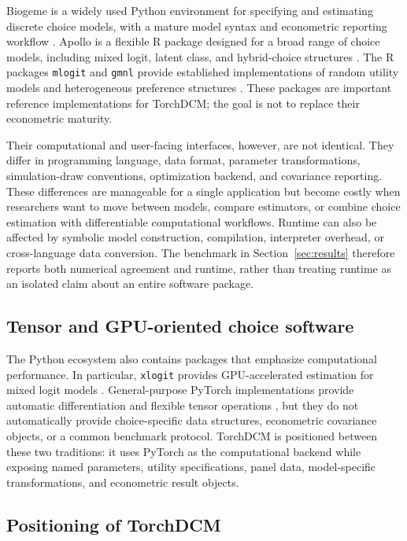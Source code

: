 \documentclass[11pt]{article}
\begin{document}
Biogeme is a widely used Python environment for specifying and estimating
discrete choice models, with a mature model syntax and econometric reporting
workflow \citep{bierlaire2023biogeme}. Apollo is a flexible R package designed
for a broad range of choice models, including mixed logit, latent class, and
hybrid-choice structures \citep{hess2019apollo}. The R packages \texttt{mlogit}
and \texttt{gmnl} provide established implementations of random utility models
and heterogeneous preference structures \citep{croissant2020mlogit,sarrias2017gmnl}.
These packages are important reference implementations for TorchDCM; the goal
is not to replace their econometric maturity.

Their computational and user-facing interfaces, however, are not identical.
They differ in programming language, data format, parameter transformations,
simulation-draw conventions, optimization backend, and covariance reporting.
These differences are manageable for a single application but become costly
when researchers want to move between models, compare estimators, or combine
choice estimation with differentiable computational workflows. Runtime can also
be affected by symbolic model construction, compilation, interpreter overhead,
or cross-language data conversion. The benchmark in Section~\ref{sec:results}
therefore reports both numerical agreement and runtime, rather than treating
runtime as an isolated claim about an entire software package.

\subsection{Tensor and GPU-oriented choice software}

The Python ecosystem also contains packages that emphasize computational
performance. In particular, \texttt{xlogit} provides GPU-accelerated estimation
for mixed logit models \citep{arteaga2022xlogit}. General-purpose PyTorch
implementations provide automatic differentiation and flexible tensor
operations \citep{paszke2019pytorch}, but they do not automatically provide
choice-specific data structures, econometric covariance objects, or a common
benchmark protocol. TorchDCM is positioned between these two traditions: it
uses PyTorch as the computational backend while exposing named parameters,
utility specifications, panel data, model-specific transformations, and
econometric result objects.

\subsection{Positioning of TorchDCM}
\end{document}
